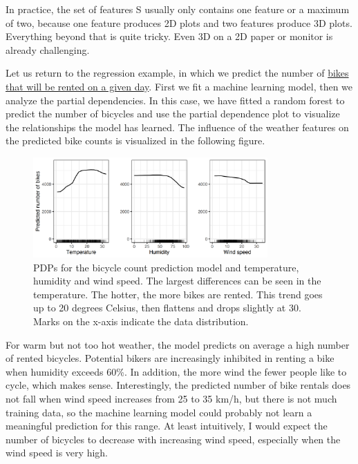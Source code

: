 \documentclass[
  10pt,
]{scrbook}
\begin{document}
In practice, the set of features S usually only contains one feature or a maximum of two, because one feature produces 2D plots and two features produce 3D plots.
Everything beyond that is quite tricky.
Even 3D on a 2D paper or monitor is already challenging.

Let us return to the regression example, in which we predict the number of \protect\hyperlink{bike-data}{bikes that will be rented on a given day}.
First we fit a machine learning model, then we analyze the partial dependencies.
In this case, we have fitted a random forest to predict the number of bicycles and use the partial dependence plot to visualize the relationships the model has learned.
The influence of the weather features on the predicted bike counts is visualized in the following figure.

\begin{figure}

{\centering \includegraphics[width=0.8\textwidth]{images/pdp-bike-1} 

}

\caption{PDPs for the bicycle count prediction model and temperature, humidity and wind speed. The largest differences can be seen in the temperature. The hotter, the more bikes are rented. This trend goes up to 20 degrees Celsius, then flattens and drops slightly at 30. Marks on the x-axis indicate the data distribution.}\label{fig:pdp-bike}
\end{figure}

For warm but not too hot weather, the model predicts on average a high number of rented bicycles.
Potential bikers are increasingly inhibited in renting a bike when humidity exceeds 60\%.
In addition, the more wind the fewer people like to cycle, which makes sense.
Interestingly, the predicted number of bike rentals does not fall when wind speed increases from 25 to 35 km/h, but there is not much training data, so the machine learning model could probably not learn a meaningful prediction for this range.
At least intuitively, I would expect the number of bicycles to decrease with increasing wind speed, especially when the wind speed is very high.
\end{document}

